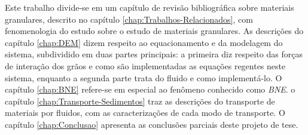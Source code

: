     Este trabalho divide-se em um capítulo de revisão bibliográfica sobre materiais granulares, descrito no capítulo \ref{chap:Trabalhos-Relacionados}, com fenomenologia do estudo sobre o estudo de materiais granulares. As descrições do capítulo \ref{chap:DEM} dizem respeito ao equacionamento e da modelagem do sistema, subdividido em duas partes principais: a primeira diz respeito das forças de interação dos grãos e como são implementadas as equações regentes neste sistema, enquanto a segunda parte trata do fluido e como implementá-lo. O capítulo \ref{chap:BNE} refere-se em especial ao fenômeno conhecido como \textit{BNE}. o capítulo \ref{chap:Transporte-Sedimentos} traz as descrições do transporte de materiais por fluidos, com as caracterizações de cada modo de transporte. O capítulo \ref{chap:Conclusao} apresenta as conclusões parciais deste projeto de tese.



